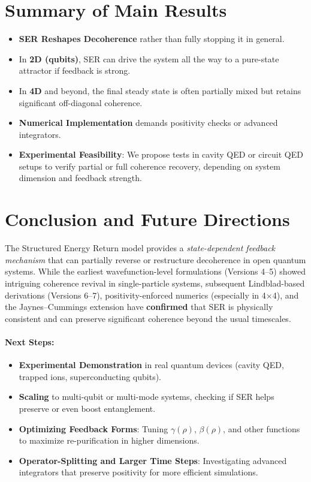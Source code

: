 \documentclass[12pt]{article}
\begin{document}
\section{Summary of Main Results}
\begin{itemize}
\item \textbf{SER Reshapes Decoherence} rather than fully stopping it in general.
\item In \textbf{2D (qubits)}, SER can drive the system all the way to a pure-state attractor if feedback is strong.
\item In \textbf{4D} and beyond, the final steady state is often partially mixed but retains significant off-diagonal coherence.
\item \textbf{Numerical Implementation} demands positivity checks or advanced integrators.
\item \textbf{Experimental Feasibility}: We propose tests in cavity QED or circuit QED setups to verify partial or full coherence recovery, depending on system dimension and feedback strength.
\end{itemize}

\section{Conclusion and Future Directions}
The Structured Energy Return model provides a \emph{state-dependent feedback mechanism} that can partially reverse or restructure decoherence in open quantum systems. While the earliest wavefunction-level formulations (Versions 4--5) showed intriguing coherence revival in single-particle systems, subsequent Lindblad-based derivations (Versions 6--7), positivity-enforced numerics (especially in 4$\times$4), and the Jaynes--Cummings extension have \textbf{confirmed} that SER is physically consistent and can preserve significant coherence beyond the usual timescales.

\paragraph{Next Steps:}
\begin{itemize}
\item \textbf{Experimental Demonstration} in real quantum devices (cavity QED, trapped ions, superconducting qubits).
\item \textbf{Scaling} to multi-qubit or multi-mode systems, checking if SER helps preserve or even boost entanglement.
\item \textbf{Optimizing Feedback Forms}: Tuning $\gamma(\rho)$, $\beta(\rho)$, and other functions to maximize re-purification in higher dimensions.
\item \textbf{Operator-Splitting and Larger Time Steps}: Investigating advanced integrators that preserve positivity for more efficient simulations.
\end{itemize}
\end{document}
